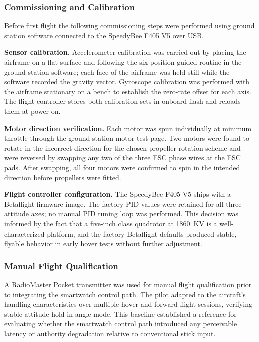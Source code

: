 \subsubsection{Commissioning and Calibration}

Before first flight the following commissioning steps were performed using ground station software
connected to the SpeedyBee F405 V5 over USB.

\textbf{Sensor calibration.}
Accelerometer calibration was carried out by placing the airframe on a flat surface and following
the six-position guided routine in the ground station software; each face of the airframe was held
still while the software recorded the gravity vector.
Gyroscope calibration was performed with the airframe stationary on a bench to establish the
zero-rate offset for each axis.
The flight controller stores both calibration sets in onboard flash and reloads them at power-on.

\textbf{Motor direction verification.}
Each motor was spun individually at minimum throttle through the ground station motor test page.
Two motors were found to rotate in the incorrect direction for the chosen propeller-rotation scheme
and were reversed by swapping any two of the three ESC phase wires at the ESC pads.
After swapping, all four motors were confirmed to spin in the intended direction before propellers
were fitted.

\textbf{Flight controller configuration.}
The SpeedyBee F405 V5 ships with a Betaflight firmware image.
The factory PID values were retained for all three attitude axes; no manual PID tuning loop was
performed.
This decision was informed by the fact that a five-inch class quadrotor at 1860~KV is a
well-characterized platform, and the factory Betaflight defaults produced stable, flyable behavior
in early hover tests without further adjustment.

\subsubsection{Manual Flight Qualification}

A RadioMaster Pocket transmitter was used for manual flight qualification prior to integrating the
smartwatch control path.
The pilot adapted to the aircraft's handling characteristics over multiple hover and forward-flight
sessions, verifying stable attitude hold in angle mode.
This baseline established a reference for evaluating whether the smartwatch control path
introduced any perceivable latency or authority degradation relative to conventional stick input.

